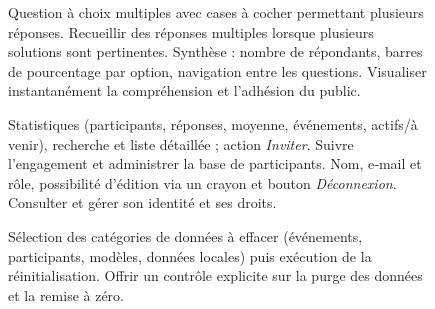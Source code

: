 \begin{figure}[htbp]
  \centering
     {Question à choix multiples avec cases à cocher permettant plusieurs réponses.}%
     {Recueillir des réponses multiples lorsque plusieurs solutions sont pertinentes.}
  \hfill
     {Synthèse : nombre de répondants, barres de pourcentage par option, navigation entre les questions.}%
     {Visualiser instantanément la compréhension et l'adhésion du public.}
\end{figure}

\begin{figure}[htbp]
  \centering
     {Statistiques (participants, réponses, moyenne, événements, actifs/à venir), recherche et liste détaillée ; action \emph{Inviter}.}%
     {Suivre l'engagement et administrer la base de participants.}
  \hfill
     {Nom, e‑mail et rôle, possibilité d'édition via un crayon et bouton \emph{Déconnexion}.}%
     {Consulter et gérer son identité et ses droits.}
\end{figure}

\begin{figure}[htbp]
  \centering
     {Sélection des catégories de données à effacer (événements, participants, modèles, données locales) puis exécution de la réinitialisation.}%
     {Offrir un contrôle explicite sur la purge des données et la remise à zéro.}
  \hfill
  \begin{minipage}[t]{0.48\linewidth}
  \end{minipage}
\end{figure}

